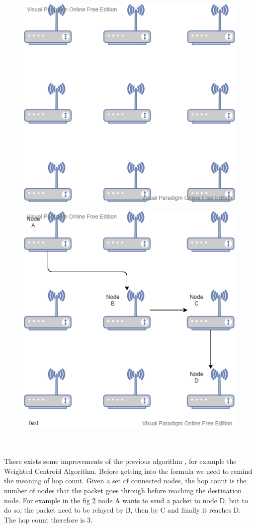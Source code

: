 \documentclass[12pt]{report}
\begin{document}
\begin{figure}[h]
\centering
\includegraphics[scale=0.6]{pic1}
\caption{}
\label{fig:3}
\end{figure}
\begin{figure}[h]
\centering
\includegraphics[scale=0.6]{pic2}
\caption{}
\label{fig:4}
\end{figure}
\\\\There exists some improvements of the previous algorithm \cite{KAUR201982}, for example the Weighted Centroid Algorithm. Before getting into the formula we need to remind the meaning of hop count. Given a set of connected nodes, the hop count is the number of nodes that the packet goes through before reaching the destination node. For example in the fig \ref{fig:4} node A wants to send a packet to node D, but to do so, the packet need to be relayed by B, then by C and finally it reaches D. The hop count therefore is 3.\\\\
\end{document}
